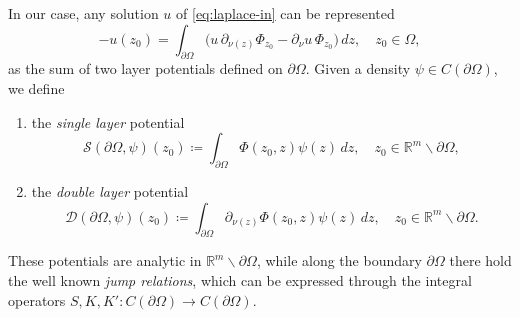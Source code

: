 \documentclass[10pt, a4paper]{article} %
\numberwithin{equation}{section}
\theoremstyle{definition}
\theoremstyle{plain}
\theoremstyle{plain}
\theoremstyle{plain}
\newtheorem{proposition}[subsection]{Proposition}
\theoremstyle{plain}
\theoremstyle{plain}
\theoremstyle{plain}
\theoremstyle{plain}
\theoremstyle{plain}
\begin{document}
In our case, any solution $u$ of \eqref{eq:laplace-in} can be represented
\begin{equation}
  \label{eq:representation-formula-harmonics}
  - u(z_0) = \int_{\partial \Omega}\big(u\, \partial_{\nu(z)} \Phi_{z_0}
  - \partial_\nu u\,\Phi_{z_0}\big)\,dz, \quad z_0 \in \Omega,
\end{equation}
as the sum of two layer potentials defined on $\partial\Omega$.
Given a density $\psi\in C(\partial \Omega)$, we define
\begin{enumerate}
  \item the \emph{single layer} potential
   \begin{equation}
    \mathcal{S}(\partial \Omega,\psi)(z_0)\coloneqq \int_{\partial \Omega} \Phi(z_0, z)\psi(z)\, dz,\quad z_0\in\mathbb{R}^m \backslash\partial \Omega, \label{eq:definition-single-layer}
   \end{equation}
  \item the \emph{double layer} potential
   \begin{equation}
    \mathcal{D}(\partial \Omega,\psi)(z_0)\coloneqq \int_{\partial \Omega} \partial_{\nu(z)}\Phi(z_0, z)\psi(z)\, dz,\quad z_0\in\mathbb{R}^m \backslash\partial \Omega. \label{eq:definition-double-layer}
   \end{equation}
\end{enumerate}
These potentials are analytic in $\mathbb{R}^m\backslash\partial\Omega$,
while along the boundary $\partial\Omega$ there hold the well known \emph{jump relations}, 
which can be expressed through the integral operators 
$S, K, K': C(\partial \Omega)\to C(\partial \Omega)$.
\end{document}
